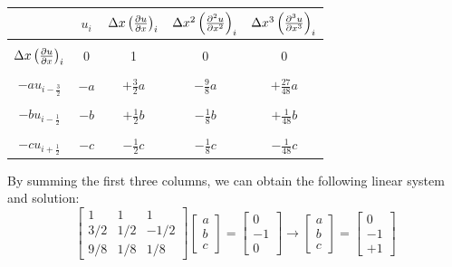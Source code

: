 \documentclass[10pt, reqno]{amsart}
\begin{document}
\begin{multicols}{2}
    \begin{center}
        \begin{tabular}{ c | c c c c}
          & $u_i$ & $\Delta x \left( \pdv{u}{x} \right)_i$ & $\Delta x^2 \left( \pdv[2]{u}{x} \right)_i$ & $\Delta x^3 \left( \pdv[3]{u}{x} \right)_i$ \\ 
          \hline\\
          $\Delta x \left( \pdv{u}{x} \right)_i$ & 0 & 1 & 0 & 0 \\
          \\
          $-a u_{i - \frac{3}{2}}$ & $-a$ & $+\frac{3}{2} a$ & $-\frac{9}{8} a$ & $+\frac{27}{48} a$ \\
          \\
          $-b u_{i - \frac{1}{2}}$ & $-b$ & $ + \frac{1}{2} b$ & $ -\frac{1}{8} b$ & $ +\frac{1}{48} b$ \\
          \\
          $-c u_{i + \frac{1}{2}}$ & $-c$ & $-\frac{1}{2} c$ & $-\frac{1}{8} c$ & $- \frac{1}{48} c$ \\
        \end{tabular}
    \end{center}
    By summing the first three columns, we can obtain the following linear system and solution:
    \begin{equation}
        \begin{bmatrix}
            1 & 1 & 1\\
            3/2 & 1/2 & -1/2\\
            9/8 & 1/8 & 1/8
        \end{bmatrix} \begin{bmatrix}
            a \\ b \\ c
        \end{bmatrix} = \begin{bmatrix}
            0 \\ -1 \\ 0
        \end{bmatrix} \to \begin{bmatrix}
            a \\ b \\ c
        \end{bmatrix} = \begin{bmatrix}
            0 \\ -1 \\ +1
        \end{bmatrix}
    \end{equation}

\end{multicols}
\end{document}
